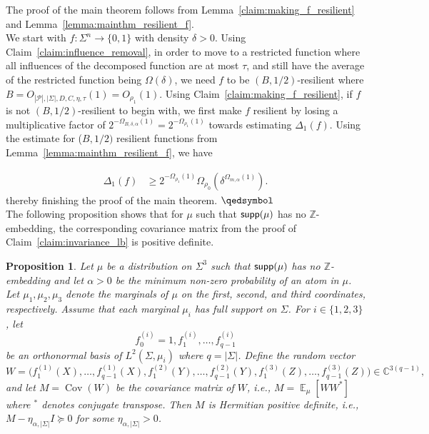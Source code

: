 \documentclass[11pt]{article}
\newtheorem{proposition}[thm]{Proposition}
\newcommand\Expect[2]{{\mathop{\mathbb{E}}_{#1}\left[ {#2} \right]}}
\renewcommand\geq{\geqslant}
\begin{document}
The proof of the main theorem follows from Lemma~\ref{claim:making_f_resilient} and Lemma~\ref{lemma:mainthm_resilient_f}.\\

 We start with $f:\Sigma^n \rightarrow \{0,1\}$ with density $\delta>0$. Using Claim~\ref{claim:influence_removal}, in order to move to a restricted function where all influences of the decomposed function are at most $\tau$, and still have the average of the restricted function being $\Omega(\delta)$, we need $f$ to be $(B, 1/2)$-resilient where $B = O_{|\mathcal{P}|, |\Sigma|, D, C,\eta, \tau}(1) = O_{\rho_1}(1)$. Using Claim~\ref{claim:making_f_resilient}, if $f$ is not $(B, 1/2)$-resilient to begin with, we first make $f$ resilient by losing a multiplicative factor of $2^{-\Omega_{B, \delta, \alpha}(1)} =  2^{-\Omega_{\rho_1}(1)}$ towards estimating $\Delta_1(f)$. Using the estimate for ($B, 1/2)$ resilient functions from Lemma~\ref{lemma:mainthm_resilient_f}, we have

\begin{align*}
\Delta_1(f) &\geq 2^{-\Omega_{\rho_1}(1)}\Omega_{\rho_0}(\delta^{\Omega_{m,\alpha}(1)}).
\end{align*}
thereby finishing the proof of the main theorem. $\qedsymbol$\\

The following proposition shows that for $\mu$ such that ${\sf supp}(\mu)$ has no $\mathbb{Z}$-embedding, the corresponding covariance matrix from the proof of Claim~\ref{claim:invariance_lb} is positive definite. 

\begin{proposition}\label{prop:positive_definite}
Let $\mu$ be a distribution on $\Sigma^3$ such that ${\sf supp}(\mu)$ has no $\mathbb{Z}$-embedding and let $\alpha>0$ be the minimum non-zero probability of an atom in $\mu$. Let $\mu_1,\mu_2,\mu_3$ denote the marginals of $\mu$ on the first, second, and third coordinates, respectively. Assume that each marginal $\mu_i$ has full support on $\Sigma$. For
$i\in\{1,2,3\}$, let
\[
f^{(i)}_0=1,f^{(i)}_1,\ldots,f^{(i)}_{q-1}
\]
be an orthonormal basis of $L^2(\Sigma,\mu_i)$ where $q=|\Sigma|$. Define the random vector
\[
W=
\bigl(
f^{(1)}_1(X),\ldots,f^{(1)}_{q-1}(X),
f^{(2)}_1(Y),\ldots,f^{(2)}_{q-1}(Y),
f^{(3)}_1(Z),\ldots,f^{(3)}_{q-1}(Z)
\bigr)
\in\mathbb{C}^{3(q-1)},
\]
and let $M=\operatorname{Cov}(W)$ be the covariance matrix of $W$, i.e.,  $M= \Expect{\mu}{ WW^* }$ where $^*$ denotes conjugate transpose. Then $M$ is Hermitian positive definite, i.e., $M-\eta_{\alpha, |\Sigma|}I\succeq 0$ for some $\eta_{\alpha, |\Sigma|}>0$.
\end{proposition}
\end{document}
